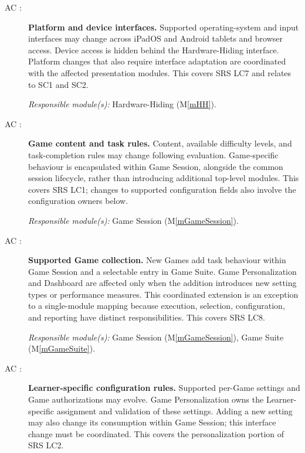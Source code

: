 \documentclass[12pt, titlepage]{article}
\newcounter{acnum}
\newcommand{\actheacnum}{AC\theacnum}
\newcommand{\mref}[1]{M\ref{#1}}
\begin{document}
\begin{description}

\item[ \actheacnum
\label{acHardware}:]
\textbf{Platform and device interfaces.}
Supported operating-system and input interfaces may change across iPadOS and Android tablets and browser access. Device access is hidden behind the Hardware-Hiding interface. Platform changes that also require interface adaptation are coordinated with the affected presentation modules. This covers SRS LC7 and relates to SC1 and SC2.

\textit{Responsible module(s):} Hardware-Hiding (\mref{mHH}).

\item[ \actheacnum
\label{acGameImplementation}:]
\textbf{Game content and task rules.}
Content, available difficulty levels, and task-completion rules may change following evaluation. Game-specific behaviour is encapsulated within Game Session, alongside the common session lifecycle, rather than introducing additional top-level modules. This covers SRS LC1; changes to supported configuration fields also involve the configuration owners below.

\textit{Responsible module(s):} Game Session (\mref{mGameSession}).

\item[ \actheacnum
\label{acAdditionalGames}:]
\textbf{Supported Game collection.}
New Games add task behaviour within Game Session and a selectable entry in Game Suite. Game Personalization and Dashboard are affected only when the addition introduces new setting types or performance measures. This coordinated extension is an exception to a single-module mapping because execution, selection, configuration, and reporting have distinct responsibilities. This covers SRS LC8.

\textit{Responsible module(s):} Game Session (\mref{mGameSession}),
Game Suite (\mref{mGameSuite}).

\item[ \actheacnum
\label{acCustomization}:]
\textbf{Learner-specific configuration rules.}
Supported per-Game settings and Game authorizations may evolve. Game Personalization owns the Learner-specific assignment and validation of these settings. Adding a new setting may also change its consumption within Game Session; this interface change must be coordinated. This covers the personalization portion of SRS LC2.


\end{description}
\end{document}
